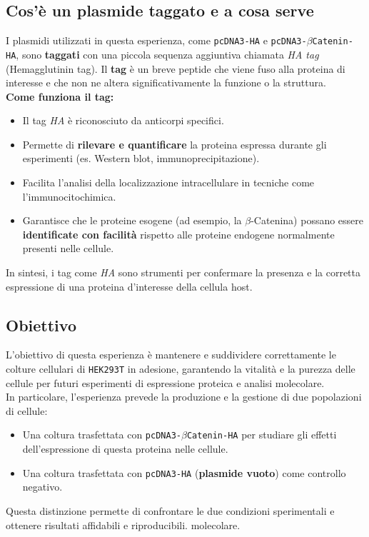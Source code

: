 \vspace{1em}
\subsection{Cos'è un plasmide taggato e a cosa serve}

I plasmidi utilizzati in questa esperienza, come \texttt{pcDNA3-HA} e \texttt{pcDNA3-$\beta$Catenin-HA}, sono \textbf{taggati} con una piccola sequenza aggiuntiva chiamata \textit{HA tag} (Hemagglutinin tag).  
Il \textbf{tag} è un breve peptide che viene fuso alla proteina di interesse e che non ne altera significativamente la funzione o la struttura.  
\vspace{0.5em}\\
\textbf{Come funziona il tag:}
\begin{itemize}
  \item Il tag \textit{HA} è riconosciuto da anticorpi specifici.
  \item Permette di \textbf{rilevare e quantificare} la proteina espressa durante gli esperimenti (es. Western blot, immunoprecipitazione).
  \item Facilita l’analisi della localizzazione intracellulare in tecniche come l’immunocitochimica.
  \item Garantisce che le proteine esogene (ad esempio, la $\beta$-Catenina) possano essere \textbf{identificate con facilità} rispetto alle proteine endogene normalmente presenti nelle cellule.
\end{itemize}

In sintesi, i tag come \textit{HA} sono strumenti per confermare la presenza e la corretta espressione di una proteina d'interesse della cellula host.

\newpage
\subsection{Obiettivo}
\small{
  L’obiettivo di questa esperienza è mantenere e suddividere correttamente le colture cellulari di \texttt{HEK293T} in adesione, garantendo la vitalità e la purezza delle cellule per futuri esperimenti di espressione proteica e analisi molecolare.
}
\vspace{0.5em}\\
In particolare, l’esperienza prevede la produzione e la gestione di due popolazioni di cellule:
\begin{itemize}
  \item Una coltura trasfettata con \texttt{pcDNA3-$\beta$Catenin-HA} per studiare gli effetti dell’espressione di questa proteina nelle cellule.
  \item Una coltura trasfettata con \texttt{pcDNA3-HA} (\textbf{plasmide vuoto}) come controllo negativo.
\end{itemize}
Questa distinzione permette di confrontare le due condizioni sperimentali e ottenere risultati affidabili e riproducibili.
molecolare.\\
\vspace{0.5em}
